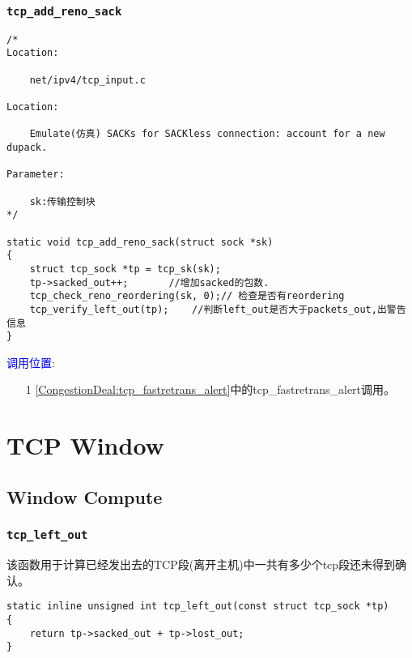         \subsubsection{\texttt{tcp_add_reno_sack}}
			\label{ACKUpdate:tcp_add_reno_sack}
\begin{verbatim}
/* 
Location:

    net/ipv4/tcp_input.c

Location:

    Emulate(仿真) SACKs for SACKless connection: account for a new dupack.

Parameter:

    sk:传输控制块
*/

static void tcp_add_reno_sack(struct sock *sk)
{
    struct tcp_sock *tp = tcp_sk(sk);
    tp->sacked_out++;       //增加sacked的包数.
    tcp_check_reno_reordering(sk, 0);// 检查是否有reordering
    tcp_verify_left_out(tp);    //判断left_out是否大于packets_out,出警告信息
}
\end{verbatim}

		\textcolor{blue}{调用位置}:
            \begin{enumerate}
            	\item[1]       \ref{CongestionDeal:tcp_fastretrans_alert}中的tcp\_fastretrans\_alert调用。
            \end{enumerate}

\section{TCP Window}
    \subsection{Window Compute}
        \subsubsection{\texttt{tcp_left_out}}
            该函数用于计算已经发出去的TCP段(离开主机)中一共有多少个tcp段还未得到确认。
\begin{verbatim}
static inline unsigned int tcp_left_out(const struct tcp_sock *tp)
{
    return tp->sacked_out + tp->lost_out;
}
\end{verbatim}
